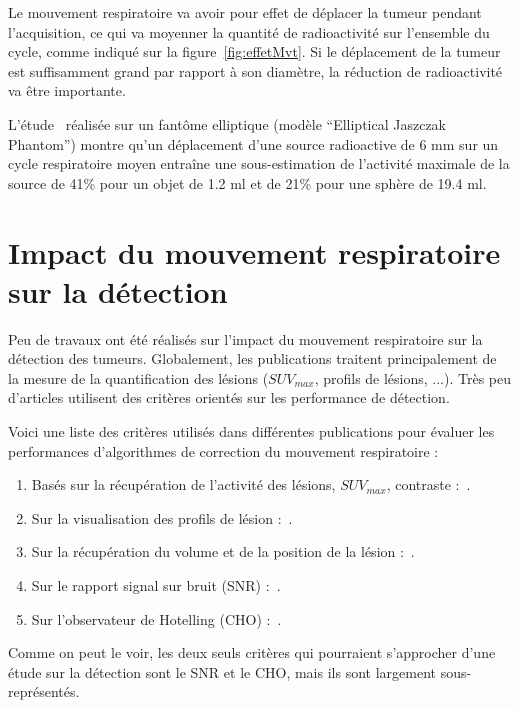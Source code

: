 Le mouvement respiratoire va avoir pour effet de déplacer la tumeur pendant l'acquisition, ce qui va moyenner la quantité de radioactivité sur l'ensemble du cycle, comme indiqué sur la figure~\ref{fig:effetMvt}. Si le déplacement de la tumeur est suffisamment grand par rapport à son diamètre, la réduction de radioactivité va être importante.

L'étude~\cite{boucher2004respiratory} réalisée sur un fantôme elliptique (modèle ``Elliptical Jaszczak Phantom'') montre qu'un déplacement d'une source radioactive de 6 mm sur un cycle respiratoire moyen entraîne une sous-estimation de l'activité maximale de la source de 41\% pour un objet de 1.2 ml et de 21\% pour une sphère de 19.4 ml.


\section{Impact du mouvement respiratoire sur la détection}

Peu de travaux ont été réalisés sur l'impact du mouvement respiratoire sur la détection des tumeurs. Globalement, les publications traitent  principalement de la mesure de la quantification des lésions ($SUV_{max}$, profils de lésions, ...). Très peu d'articles utilisent des critères orientés sur les performance de détection.

Voici une liste des critères utilisés dans différentes publications pour évaluer les performances d'algorithmes de correction du mouvement respiratoire :

\begin{enumerate}
 \item Basés sur la récupération de l'activité des lésions, $SUV_{max}$, contraste :~\cite{GuopingChang2010Implementation,lamare2007list,nehmeh2002effect,detorie2008quantitative}.
 \item Sur la visualisation des profils de lésion :~\cite{GuopingChang2010Implementation,Thielemans2006Lesion,lamare2007list}.
 \item Sur la récupération du volume et de la position de la lésion :~\cite{GuopingChang2010Implementation,lamare2007list,nehmeh2002effect}.
 \item Sur le rapport signal sur bruit (SNR) :~\cite{GuopingChang2010Implementation}.
 \item Sur l'observateur de Hotelling (CHO) :~\cite{Thielemans2006Lesion}.
\end{enumerate}

Comme on peut le voir, les deux seuls critères qui pourraient s'approcher d'une étude sur la détection sont le SNR et le CHO, mais ils sont largement sous-représentés. 

